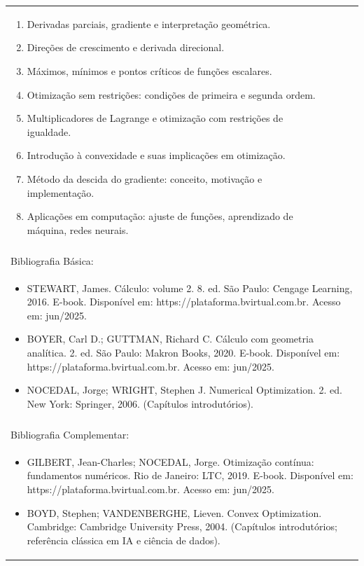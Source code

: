 \documentclass[11pt]{article}
\begin{document}
\begin{center}
\begin{longtable}{|p{4cm}|p{4cm}|p{4cm}|p{4cm}|}
{\begin{enumerate}
\item Derivadas parciais, gradiente e interpretação geométrica.
\item Direções de crescimento e derivada direcional.
\item Máximos, mínimos e pontos críticos de funções escalares.
\item Otimização sem restrições: condições de primeira e segunda ordem.
\item Multiplicadores de Lagrange e otimização com restrições de igualdade.
\item Introdução à convexidade e suas implicações em otimização.
\item Método da descida do gradiente: conceito, motivação e implementação.
\item Aplicações em computação: ajuste de funções, aprendizado de máquina, redes neurais.\end{enumerate}}\\
\multicolumn{4}{|p{16cm}|}{}\\
\hline
\multicolumn{4}{|p{16cm}|}{Bibliografia Básica:}\\
\multicolumn{4}{|p{16cm}|}{%
\begin{itemize}\item STEWART, James. Cálculo: volume 2. 8. ed. São Paulo: Cengage Learning, 2016. E-book. Disponível em: https://plataforma.bvirtual.com.br. Acesso em: jun/2025.
\item BOYER, Carl D.; GUTTMAN, Richard C. Cálculo com geometria analítica. 2. ed. São Paulo: Makron Books, 2020. E-book. Disponível em: https://plataforma.bvirtual.com.br. Acesso em: jun/2025.
\item NOCEDAL, Jorge; WRIGHT, Stephen J. Numerical Optimization. 2. ed. New York: Springer, 2006. (Capítulos introdutórios).\end{itemize}}\\
\multicolumn{4}{|p{16cm}|}{}\\
\hline
\multicolumn{4}{|p{16cm}|}{Bibliografia Complementar:}\\
\multicolumn{4}{|p{16cm}|}{%
\begin{itemize}\item GILBERT, Jean-Charles; NOCEDAL, Jorge. Otimização contínua: fundamentos numéricos. Rio de Janeiro: LTC, 2019. E-book. Disponível em: https://plataforma.bvirtual.com.br. Acesso em: jun/2025.
\item BOYD, Stephen; VANDENBERGHE, Lieven. Convex Optimization. Cambridge: Cambridge University Press, 2004. (Capítulos introdutórios; referência clássica em IA e ciência de dados).

\end{itemize}}
\end{longtable}
\end{center}
\end{document}
